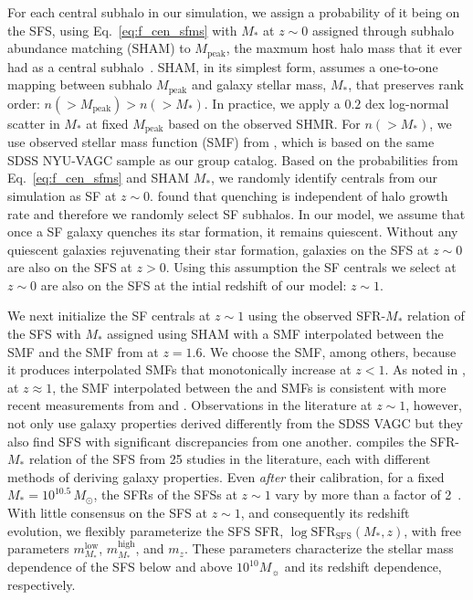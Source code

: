 \documentclass[12pt, letterpaper, preprint, tighten]{aastex62}
\begin{document}
For each central subhalo in our simulation, we assign a probability of it 
being on the SFS, using Eq.~\ref{eq:f_cen_sfms} with $M_*$ at $z \sim 0$ 
assigned through subhalo abundance matching (SHAM) to $M_\mathrm{peak}$, 
the maxmum host halo mass that it ever had as a central subhalo~\citep{conroy2006,vale2006,yang2009,wetzel2012,leja2013,wetzel2013,wetzel2014,hahn2017b}. 
SHAM, in its simplest form, assumes a one-to-one mapping between subhalo 
$M_\mathrm{peak}$ and galaxy stellar mass, $M_*$, that preserves rank 
order: $n({>}M_\mathrm{peak}) > n({>}M_*)$. In practice, we apply a $0.2$ 
dex log-normal scatter in $M_*$ at fixed $M_\mathrm{peak}$ based on the 
observed SHMR. For $n({>}M_*)$, we use observed stellar mass function (SMF) 
from \cite{li2009}, which is based on the same SDSS NYU-VAGC sample as our 
group catalog. Based on the probabilities from Eq.~\ref{eq:f_cen_sfms} and 
SHAM $M_*$, we randomly identify centrals from our simulation as SF at 
$z \sim 0$. \cite{tinker2017b,tinker2018} found that quenching is 
independent of halo growth rate and therefore we randomly select SF subhalos.  
In our model, we assume that once a SF galaxy quenches its star formation, 
it remains quiescent.  %
Without any quiescent galaxies rejuvenating their star formation, galaxies
on the SFS at $z\sim0$ are also on the SFS at $z > 0$. Using this assumption
the SF centrals we select at $z \sim 0$ are also on the SFS at the intial
redshift of our model: $z \sim 1$. 

We next initialize the SF centrals at $z\sim1$ using the observed SFR-$M_*$ 
relation of the SFS with $M_*$ assigned using SHAM with a SMF interpolated
between the \cite{li2009} SMF and the SMF from \cite{marchesini2009} at 
$z = 1.6$. We choose the \cite{marchesini2009} SMF, among others, because it 
produces interpolated SMFs that monotonically increase at $z < 1$. As noted 
in \cite{hahn2017b}, at $z \approx 1$, the SMF interpolated between the 
\cite{li2009} and \cite{marchesini2009} SMFs is consistent with more recent 
measurements from \cite{muzzin2013} and \cite{ilbert2013}. Observations in 
the literature at $z \sim 1$, however, not only use galaxy properties 
derived differently from the SDSS VAGC but they also find SFS with significant 
discrepancies from one another. \cite{speagle2014} compiles the SFR-$M_*$ 
relation of the SFS from 25 studies in the literature, each with different 
methods of deriving galaxy properties. Even \emph{after} their calibration, 
for a fixed $M_* = 10^{10.5}\, M_\odot$, the SFRs of the SFSs at $z \sim 1$ 
vary by more than a factor of 2~\citep[see Figure 2 of][]{speagle2014}. 
With little consensus on the SFS at $z\sim1$, and consequently its redshift
evolution, we flexibly parameterize the SFS SFR, 
$\log\mathrm{SFR}_\mathrm{SFS}(M_*, z)$, 
with free parameters $m^\mathrm{low}_{M_*}$, $m^\mathrm{high}_{M_*}$, and 
$m_z$. These parameters characterize the stellar mass dependence of the SFS 
below and above $10^{10} M_\sun$ and its redshift dependence, respectively. 
\end{document}
